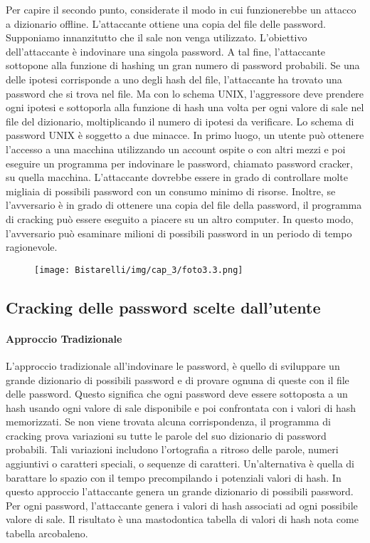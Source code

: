 Per capire il secondo punto, considerate il modo in cui funzionerebbe un attacco a dizionario offline. L'attaccante ottiene una copia del file delle password. Supponiamo innanzitutto che il sale non venga utilizzato. L'obiettivo dell'attaccante è indovinare una singola password. A tal fine, l'attaccante sottopone alla funzione di hashing un gran numero di password probabili. Se una delle ipotesi corrisponde a uno degli hash del file, l'attaccante ha trovato una password che si trova nel file. Ma con lo schema UNIX, l'aggressore deve prendere ogni ipotesi e sottoporla alla funzione di hash una volta per ogni valore di sale nel file del dizionario, moltiplicando il numero di ipotesi da verificare. Lo schema di password UNIX è soggetto a due minacce. In primo luogo, un utente può ottenere l'accesso a una macchina utilizzando un account ospite o con altri mezzi e poi eseguire un programma per indovinare le password, chiamato password cracker, su quella macchina. L'attaccante dovrebbe essere in grado di controllare molte migliaia di possibili password con un consumo minimo di risorse. Inoltre, se l'avversario è in grado di ottenere una copia del file della password, il programma di cracking può essere eseguito a piacere su un altro computer. In questo modo, l'avversario può esaminare milioni di possibili password in un periodo di tempo ragionevole.

\begin{figure}[H]
	\centering
    \texttt{[image: Bistarelli/img/cap\_3/foto3.3.png]}
\end{figure}
\newpage
\subsection{Cracking delle password scelte dall'utente}
\paragraph{Approccio Tradizionale}
L'approccio tradizionale all'indovinare le password, è quello di sviluppare un grande dizionario di possibili password e di provare ognuna di queste con il file delle password. Questo significa che ogni password deve essere sottoposta a un hash usando ogni valore di sale disponibile e poi confrontata con i valori di hash memorizzati. Se non viene trovata alcuna corrispondenza, il programma di cracking prova variazioni su tutte le parole del suo dizionario di password probabili. Tali variazioni includono l'ortografia a ritroso delle parole, numeri aggiuntivi o caratteri speciali, o sequenze di caratteri. Un'alternativa è quella di barattare lo spazio con il tempo precompilando i potenziali valori di hash. In questo approccio l'attaccante genera un grande dizionario di possibili password. Per ogni password, l'attaccante genera i valori di hash associati ad ogni possibile valore di sale. Il risultato è una mastodontica tabella di valori di hash nota come tabella arcobaleno.
\\
